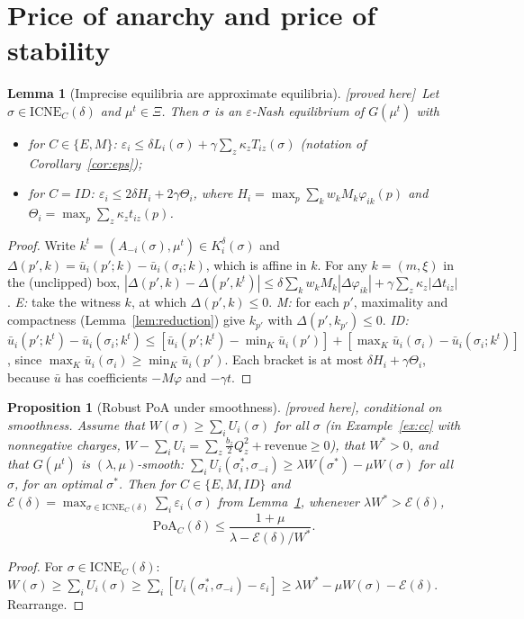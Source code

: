 \documentclass[11pt]{article}
\newtheorem{lemma}[theorem]{Lemma}
\newtheorem{proposition}[theorem]{Proposition}
\theoremstyle{definition}
\theoremstyle{remark}
\newcommand{\ub}{\bar u}
\newcommand{\ICNE}{\mathrm{ICNE}}
\newcommand{\PROVED}{\textsf{[proved here]}}
\begin{document}
\section{Price of anarchy and price of stability}\label{sec:poa}

\begin{lemma}[Imprecise equilibria are approximate equilibria]\label{lem:transfer} \PROVED\
Let $\sigma\in\ICNE_C(\delta)$ and $\mu^t\in\Xi$. Then $\sigma$ is an $\varepsilon$-Nash equilibrium of $G(\mu^t)$ with
\begin{itemize}
\item for $C\in\{E,M\}$: $\varepsilon_i\le\delta L_i(\sigma)+\gamma\sum_z\kappa_zT_{iz}(\sigma)$ (notation of Corollary~\ref{cor:eps});
\item for $C=ID$: $\varepsilon_i\le2\delta H_i+2\gamma\Theta_i$, where $H_i=\max_{p}\sum_kw_kM_k\varphi_{ik}(p)$ and $\Theta_i=\max_p\sum_z\kappa_zt_{iz}(p)$.
\end{itemize}
\end{lemma}
\begin{proof}
Write $k^t=(A_{-i}(\sigma),\mu^t)\in K_i^\delta(\sigma)$ and $\Delta(p',k)=\ub_i(p';k)-\ub_i(\sigma_i;k)$, which is affine in $k$. For any $k=(m,\xi)$ in the (unclipped) box, $|\Delta(p',k)-\Delta(p',k^t)|\le\delta\sum_kw_kM_k|\Delta\varphi_{ik}|+\gamma\sum_z\kappa_z|\Delta t_{iz}|$. \emph{E:} take the witness $k$, at which $\Delta(p',k)\le0$. \emph{M:} for each $p'$, maximality and compactness (Lemma~\ref{lem:reduction}) give $k_{p'}$ with $\Delta(p',k_{p'})\le0$. \emph{ID:} $\ub_i(p';k^t)-\ub_i(\sigma_i;k^t)\le[\ub_i(p';k^t)-\min_K\ub_i(p')]+[\max_K\ub_i(\sigma_i)-\ub_i(\sigma_i;k^t)]$, since $\max_K\ub_i(\sigma_i)\ge\min_K\ub_i(p')$. Each bracket is at most $\delta H_i+\gamma\Theta_i$, because $\ub$ has coefficients $-M\varphi$ and $-\gamma t$.
\end{proof}

\begin{proposition}[Robust PoA under smoothness]\label{prop:smooth} \PROVED, conditional on smoothness.
Assume that $W(\sigma)\ge\sum_iU_i(\sigma)$ for all $\sigma$ (in Example~\ref{ex:cc} with nonnegative charges, $W-\sum_iU_i=\sum_z\frac{b_z}{2}Q_z^2+\text{revenue}\ge0$), that $W^*>0$, and that $G(\mu^t)$ is $(\lambda,\mu)$-smooth: $\sum_iU_i(\sigma^*_i,\sigma_{-i})\ge\lambda W(\sigma^*)-\mu W(\sigma)$ for all $\sigma$, for an optimal $\sigma^*$. Then for $C\in\{E,M,ID\}$ and $\mathcal E(\delta)=\max_{\sigma\in\ICNE_C(\delta)}\sum_i\varepsilon_i(\sigma)$ from Lemma~\ref{lem:transfer}, whenever $\lambda W^*>\mathcal E(\delta)$,
\[\mathrm{PoA}_C(\delta)\le\frac{1+\mu}{\lambda-\mathcal E(\delta)/W^*}.\]
\end{proposition}
\begin{proof}
For $\sigma\in\ICNE_C(\delta)$: $W(\sigma)\ge\sum_iU_i(\sigma)\ge\sum_i[U_i(\sigma^*_i,\sigma_{-i})-\varepsilon_i]\ge\lambda W^*-\mu W(\sigma)-\mathcal E(\delta)$. Rearrange.
\end{proof}
\end{document}
